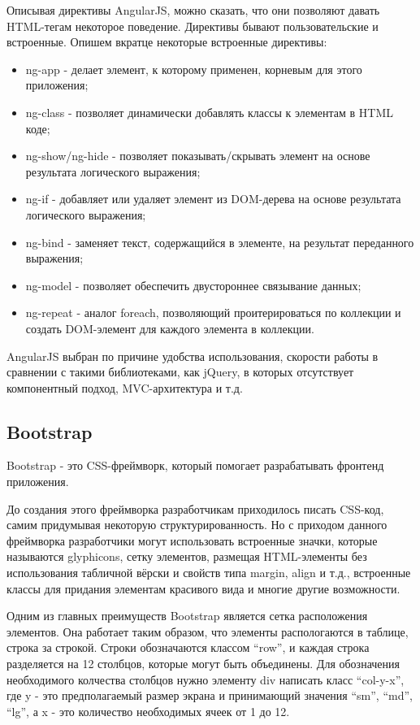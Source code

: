 Описывая директивы AngularJS, можно сказать, что они позволяют давать HTML-тегам некоторое поведение. Директивы бывают пользовательские и встроенные. Опишем вкратце некоторые встроенные директивы:

\begin{itemize}
  \item ng-app - делает элемент, к которому применен, корневым для этого приложения;
  \item ng-class - позволяет динамически добавлять классы к элементам в HTML коде;
  \item ng-show/ng-hide - позволяет показывать/скрывать элемент на основе результата логического выражения;
  \item ng-if - добавляет или удаляет элемент из DOM-дерева на основе результата логического выражения;
  \item ng-bind - заменяет текст, содержащийся в элементе, на результат переданного выражения;
  \item ng-model - позволяет обеспечить двустороннее связывание данных;
  \item ng-repeat - аналог foreach, позволяющий проитерироваться по коллекции и создать DOM-элемент для каждого элемента в коллекции.
\end{itemize}

AngularJS выбран по причине удобства использования, скорости работы в сравнении с такими библиотеками, как jQuery, в которых отсутствует компонентный подход, MVC-архитектура и т.д.

\subsection{Bootstrap}
\label{sub:technologies:bootstrap}
Bootstrap - это CSS-фреймворк, который помогает разрабатывать фронтенд приложения.

До создания этого фреймворка разработчикам приходилось писать CSS-код, самим придумывая некоторую структурированность. Но с приходом данного фреймворка разработчики могут использовать встроенные значки, которые называются glyphicons, сетку элементов, размещая HTML-элементы без использования табличной вёрски и свойств типа margin, align и т.д., встроенные классы для придания элементам красивого вида и многие другие возможности.

Одним из главных преимуществ Bootstrap является сетка расположения элементов. Она работает таким образом, что элементы распологаются в таблице, строка за строкой. Строки обозначаются классом ``row'', и каждая строка разделяется на 12 столбцов, которые могут быть объединены. Для обозначения необходимого колчества столбцов нужно элементу div написать класс ``col-y-x'', где y - это предполагаемый размер экрана и принимающий значения ``sm'', ``md'', ``lg'', а x - это количество необходимых ячеек от 1 до 12.
